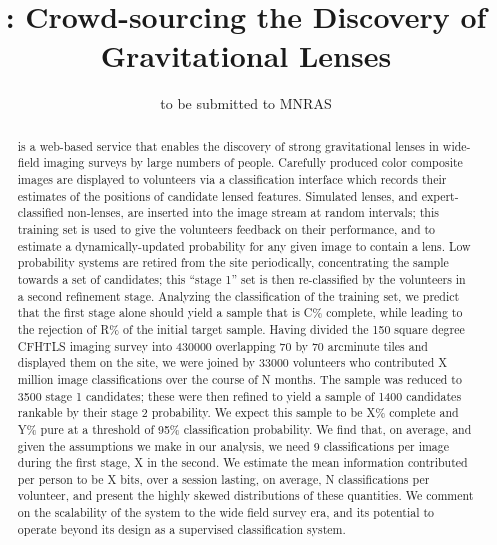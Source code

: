 \documentclass[useAMS,usenatbib,a4paper]{mn2e}
\title[\sw]
{\SW: Crowd-sourcing the Discovery of Gravitational Lenses}
\author[Marshall et al.]{%
  
}
\begin{document}
             
\date{to be submitted to MNRAS}
\pagerange{\pageref{firstpage}--\pageref{lastpage}}

\maketitle           

\label{firstpage}


\begin{abstract} 

\sw is a web-based service that enables the discovery of strong gravitational
lenses in wide-field imaging surveys by large numbers of people. Carefully
produced color composite images are displayed to volunteers via a
classification interface which records their estimates of the positions of
candidate lensed features. Simulated lenses, and expert-classified non-lenses,
are inserted into the image stream at random intervals; this training set is
used to give the volunteers feedback on their performance, and to estimate a
dynamically-updated probability for any given image to contain a lens. Low
probability systems are retired from the site periodically, concentrating the
sample towards a set of candidates; this ``stage 1'' set is then re-classified
by the volunteers in a second  refinement stage. Analyzing the classification
of the training set, we predict that the first stage alone should yield a
sample that is C\% complete, while leading to the rejection of R\% of the
initial target sample. Having divided the 150 square degree CFHTLS imaging
survey into 430000 overlapping 70 by 70 arcminute tiles and displayed them on
the site, we were joined by 33000 volunteers who contributed X million image
classifications over the course of N months. The sample was reduced to 3500
stage 1 candidates; these were then refined to yield a sample of 1400
candidates rankable by their stage 2 probability. We expect this sample to be
X\% complete and Y\% pure at a threshold of 95\% classification probability.
We find that, on average, and given the assumptions we make in our analysis,
we need 9 classifications per image during the first stage, X in the second.
We estimate the mean information contributed per person to be X bits, over a
session lasting, on average, N classifications per volunteer, and present the
highly skewed distributions of these quantities. We comment on the scalability
of the \sw system to the wide field survey era, and its potential to operate
beyond its design as a supervised classification system. 


\end{abstract}
\end{document}

